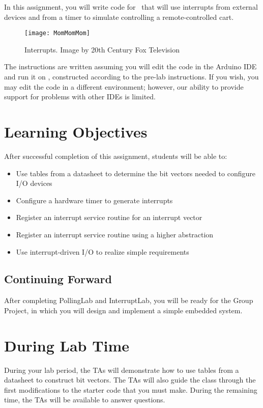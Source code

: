 In this assignment, you will write code for \runtimeenvironment\ that will use interrupts from external devices and from a timer to simulate controlling a remote-controlled cart.

\begin{figure}[h]
    \centering
    \texttt{[image: MomMomMom]}
    \caption{Interrupts. \tiny Image by 20th Century Fox Television}
\end{figure}

The instructions are written assuming you will edit the code in the Arduino IDE and run it on \runtimeenvironment, constructed according to the pre-lab instructions.
If you wish, you may edit the code in a different environment; however, our ability to provide support for problems with other IDEs is limited.

\section*{Learning Objectives}

After successful completion of this assignment, students will be able to:
\begin{itemize}
    \item Use tables from a datasheet to determine the bit vectors needed to configure I/O devices
    \item Configure a hardware timer to generate interrupts
    \item Register an interrupt service routine for an interrupt vector
    \item Register an interrupt service routine using a higher abstraction
    \item Use interrupt-driven I/O to realize simple requirements
\end{itemize}

\subsection*{Continuing Forward}

After completing PollingLab and InterruptLab, you will be ready for the Group Project, in which you will design and implement a simple embedded system.

\section*{During Lab Time}

During your lab period, the TAs will demonstrate how to use tables from a datasheet to construct bit vectors.
The TAs will also guide the class through the first modifications to the starter code that you must make.
During the remaining time, the TAs will be available to answer questions.